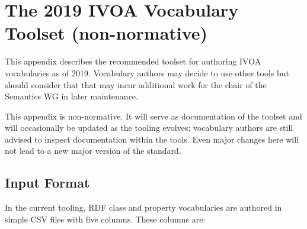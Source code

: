 \documentclass[11pt,a4paper]{ivoa}
\begin{document}
\appendix
\section{The 2019 IVOA Vocabulary Toolset (non-normative)}
\label{app:tools}

This appendix describes the recommended toolset for authoring IVOA
vocabularies as of 2019.  Vocabulary authors may decide to use other
tools but should consider that that may incur additional work for the
chair of the Semantics WG in later maintenance.

This appendix is non-normative.  It will serve as documentation of the
toolset and will occasionally be updated as the tooling evolves;
vocabulary authors are still advised to inspect documentation within the
tools.  Even major changes here will not lead to a new major version of
the standard.


\subsection{Input Format}

In the current tooling, RDF class and property 
vocabularies are authored in simple CSV files
with five columns.  These columns are:
\end{document}
